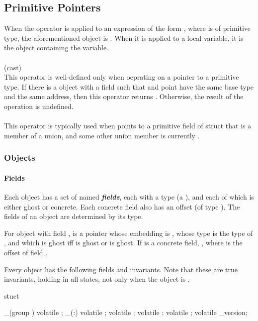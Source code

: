 \documentclass[preprint,nocopyrightspace]{sigplanconf}
\newcommand{\subsubsubsection}[1]{\paragraph{#1}}
\newcommand{\Def}[1]{\textit{\textbf{#1}}}
\begin{document}
{{\subsection{Primitive Pointers}
When the \vcc{&} operator is applied to an expression of the
form , where  is of primitive type, the
aforementioned object is . When it is applied to a local
variable, it is the object containing the variable.
\\\\
 (cast)\\
This operator is well-defined only when oeprating on a pointer  to a
primitive type. If there is a \vcc{\valid} object  with a field 
such that  and  point have the same base type and
the same address, then this operator returns . Otherwise,
the result of the operation is undefined.
\\\\
This operator is typically used when  points to a primitive
field of struct that is a member of a union, and some other union
member is currently \vcc{\valid}.  

\subsubsection{Objects}

\subsubsubsection{Fields}
Each object has a set of named \Def{fields}, each with a type
(a \vcc{\type}), and each of which is either ghost or concrete. Each
concrete field also has an offset (of type ). 
The fields of an object are determined by its type. 

For object  with field ,  is a pointer whose
embedding is , whose type is the type of , and which is
ghost iff  is ghost or  is ghost. If  is a
concrete field, ,
where  is the offset of field . 

Every object has the following fields and invariants. Note that these
are true invariants, holding in all states, not only when the object
is \vcc{\closed}.
\begin{VCC}
stuct {
  _(group \ownerOb)
  volatile \bool \closed;
  _(:\ownerOb) volatile \bool \owner;
  volatile \objset \owns; 
  volatile \bool \valid;  
  volatile \natural \version;
  volatile \natural \volatile_version; 

}
\end{VCC}}}
\end{document}
